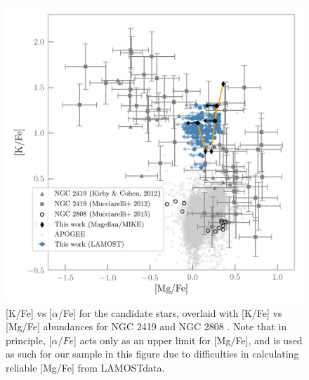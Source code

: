 \documentclass[a4paper,fleqn,usenatbib]{mnras}
\newcommand{\project}[1]{#1}
\newcommand{\lamost}{\project{LAMOST}}
\begin{document}
\begin{figure}
	\includegraphics[width=\columnwidth]{KvsMg.png}
    \caption{[K/Fe] vs [$\alpha$/Fe] for the candidate stars, overlaid with [K/Fe] vs [Mg/Fe] abundances for NGC 2419 and NGC 2808 \citep{cohenkirby2012, mucciarelli2012, mucciarelli2015}. Note that in principle, [$\alpha/Fe$] acts only as an upper limit for [Mg/Fe], and is used as such for our sample in this figure due to difficulties in calculating reliable [Mg/Fe] from \lamost data.}
    \label{KvsMg}
\end{figure}
\end{document}
